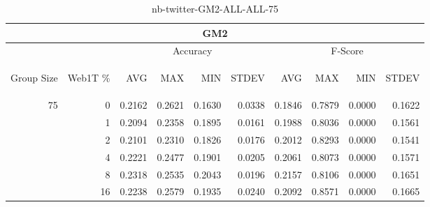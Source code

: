 \begin{center}
\begin{table}[htbp]
\begin{center}
\begin{tabular}{ | r | r | r | r | r | r | r | r | r | r |}
\hline
\multicolumn{10}{|c|}{GM2}\\
\hline
 & & \multicolumn{4}{|c|}{Accuracy} & \multicolumn{4}{|c|}{F-Score}\\ \cline{3-10}
\begin{sideways}Group Size\end{sideways} & \begin{sideways}Web1T \%\end{sideways} & \begin{sideways}AVG\end{sideways} & \begin{sideways}MAX\end{sideways} & \begin{sideways}MIN\end{sideways} & \begin{sideways}STDEV\end{sideways} & \begin{sideways}AVG\end{sideways} & \begin{sideways}MAX\end{sideways} & \begin{sideways}MIN\end{sideways} & \begin{sideways}STDEV\end{sideways}\\
\hline
\multirow{5}{*}{75}
 & 0 & 0.2162 & 0.2621 & 0.1630 & 0.0338 & 0.1846 & 0.7879 & 0.0000 & 0.1622\\ \cline{2-10}
 & 1 & 0.2094 & 0.2358 & 0.1895 & 0.0161 & 0.1988 & 0.8036 & 0.0000 & 0.1561\\ \cline{2-10}
 & 2 & 0.2101 & 0.2310 & 0.1826 & 0.0176 & 0.2012 & 0.8293 & 0.0000 & 0.1541\\ \cline{2-10}
 & 4 & 0.2221 & 0.2477 & 0.1901 & 0.0205 & 0.2061 & 0.8073 & 0.0000 & 0.1571\\ \cline{2-10}
 & 8 & 0.2318 & 0.2535 & 0.2043 & 0.0196 & 0.2157 & 0.8106 & 0.0000 & 0.1651\\ \cline{2-10}
 & 16 & 0.2238 & 0.2579 & 0.1935 & 0.0240 & 0.2092 & 0.8571 & 0.0000 & 0.1665\\ \cline{2-10}
\hline
\end{tabular}
\caption{nb-twitter-GM2-ALL-ALL-75}
\label{table:nb-twitter-GM2-ALL-ALL-75}
\end{center}
\end{table}
\end{center}

